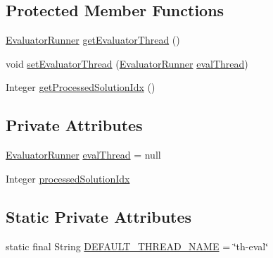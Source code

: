 \subsection*{Protected Member Functions}
\begin{DoxyCompactItemize}
\item 
\hyperlink{classit_1_1emarolab_1_1cagg_1_1core_1_1evaluation_1_1ThreadedEvaluator_1_1EvaluatorRunner}{Evaluator\-Runner} \hyperlink{classit_1_1emarolab_1_1cagg_1_1core_1_1evaluation_1_1ThreadedEvaluator_a585546270210faf361114db13ce8c281}{get\-Evaluator\-Thread} ()
\item 
void \hyperlink{classit_1_1emarolab_1_1cagg_1_1core_1_1evaluation_1_1ThreadedEvaluator_a5839478e67a0c6b53239ef89ab2f37b0}{set\-Evaluator\-Thread} (\hyperlink{classit_1_1emarolab_1_1cagg_1_1core_1_1evaluation_1_1ThreadedEvaluator_1_1EvaluatorRunner}{Evaluator\-Runner} \hyperlink{classit_1_1emarolab_1_1cagg_1_1core_1_1evaluation_1_1ThreadedEvaluator_a28ef088b9b434cc83efc7c4976756ca1}{eval\-Thread})
\item 
Integer \hyperlink{classit_1_1emarolab_1_1cagg_1_1core_1_1evaluation_1_1ThreadedEvaluator_a7a6772eab6a987fd5a4597478bfa5666}{get\-Processed\-Solution\-Idx} ()
\end{DoxyCompactItemize}
\subsection*{Private Attributes}
\begin{DoxyCompactItemize}
\item 
\hyperlink{classit_1_1emarolab_1_1cagg_1_1core_1_1evaluation_1_1ThreadedEvaluator_1_1EvaluatorRunner}{Evaluator\-Runner} \hyperlink{classit_1_1emarolab_1_1cagg_1_1core_1_1evaluation_1_1ThreadedEvaluator_a28ef088b9b434cc83efc7c4976756ca1}{eval\-Thread} = null
\item 
Integer \hyperlink{classit_1_1emarolab_1_1cagg_1_1core_1_1evaluation_1_1ThreadedEvaluator_ac70202c42ba3b8a6e3422dac9baaaba8}{processed\-Solution\-Idx}
\end{DoxyCompactItemize}
\subsection*{Static Private Attributes}
\begin{DoxyCompactItemize}
\item 
static final String \hyperlink{classit_1_1emarolab_1_1cagg_1_1core_1_1evaluation_1_1ThreadedEvaluator_a69d15fce29bcd5ce6835c656a713e242}{D\-E\-F\-A\-U\-L\-T\-\_\-\-T\-H\-R\-E\-A\-D\-\_\-\-N\-A\-M\-E} = \char`\"{}th-\/eval\char`\"{}
\end{DoxyCompactItemize}


